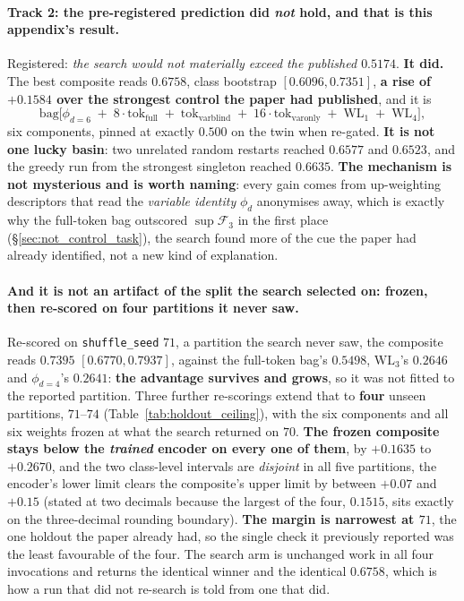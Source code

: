 \paragraph{Track 2: the pre-registered prediction did \emph{not} hold, and that is this appendix's result.} Registered: \emph{the search would not materially exceed the published $0.5174$}. \textbf{It did.} The best composite reads $\mathbf{0.6758}$, class bootstrap $[0.6096,0.7351]$, \textbf{a rise of $+0.1584$ over the strongest control the paper had published}, and it is
\[
\mathrm{bag}\bigl[\phi_{d=6} \;+\; 8\cdot\mathrm{tok}_{\mathrm{full}} \;+\; \mathrm{tok}_{\mathrm{varblind}} \;+\; 16\cdot\mathrm{tok}_{\mathrm{varonly}} \;+\; \mathrm{WL}_1 \;+\; \mathrm{WL}_4\bigr],
\]
six components, pinned at exactly $0.500$ on the twin when re-gated. \textbf{It is not one lucky basin}: two unrelated random restarts reached $0.6577$ and $0.6523$, and the greedy run from the strongest singleton reached $0.6635$. \textbf{The mechanism is not mysterious and is worth naming}: every gain comes from up-weighting descriptors that read the \emph{variable identity} $\phi_d$ anonymises away, which is exactly why the full-token bag outscored $\sup\mathcal{F}_3$ in the first place (\S\ref{sec:not_control_task}), the search found more of the cue the paper had already identified, not a new kind of explanation.

\paragraph{And it is not an artifact of the split the search selected on: frozen, then re-scored on four partitions it never saw.} Re-scored on \texttt{shuffle\_seed} $71$, a partition the search never saw, the composite reads $\mathbf{0.7395}$ $[0.6770,0.7937]$, against the full-token bag's $0.5498$, $\mathrm{WL}_3$'s $0.2646$ and $\phi_{d=4}$'s $0.2641$: \textbf{the advantage survives and grows}, so it was not fitted to the reported partition. Three further re-scorings extend that to \textbf{four} unseen partitions, $71$--$74$ (Table~\ref{tab:holdout_ceiling}), with the six components and all six weights frozen at what the search returned on $70$. \textbf{The frozen composite stays below the \emph{trained} encoder on every one of them}, by $+0.1635$ to $+0.2670$, and the two class-level intervals are \emph{disjoint} in all five partitions, the encoder's lower limit clears the composite's upper limit by between $+0.07$ and $+0.15$ (stated at two decimals because the largest of the four, $0.1515$, sits exactly on the three-decimal rounding boundary). \textbf{The margin is narrowest at $71$}, the one holdout the paper already had, so the single check it previously reported was the least favourable of the four. The search arm is unchanged work in all four invocations and returns the identical winner and the identical $0.6758$, which is how a run that did not re-search is told from one that did.

